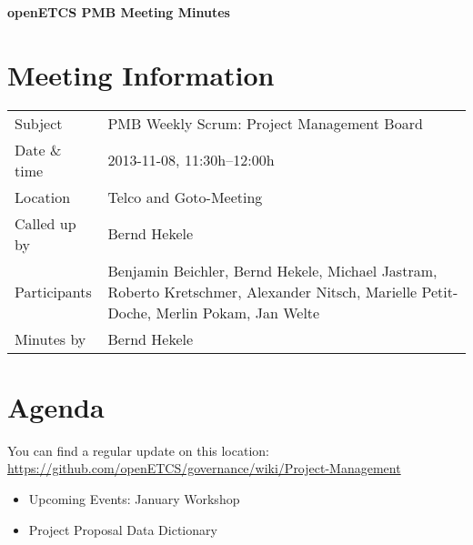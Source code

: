 \documentclass[a4paper, 11pt]{article}
\begin{document}
{\begin{center}\huge\bf openETCS PMB Meeting Minutes\end{center}}
\section{Meeting Information}

\renewcommand{\arraystretch}{1.5}
\begin{supertabular}{m{.2\textwidth}m{.8\textwidth}}
Subject & PMB Weekly Scrum: Project Management Board\\
Date \& time & 2013-11-08, 11:30h--12:00h\\
Location & Telco and Goto-Meeting\\
Called up by & Bernd Hekele\\
Participants &
Benjamin Beichler,
Bernd Hekele,
Michael Jastram,
Roberto Kretschmer,
Alexander Nitsch,
Marielle Petit-Doche,
Merlin Pokam,
Jan Welte
\\

Minutes by & Bernd Hekele\\

\end{supertabular}
\renewcommand{\arraystretch}{1.0}


\section{{Agenda}}
You can find a regular update on this location: \url{https://github.com/openETCS/governance/wiki/Project-Management}

\begin{itemize}
\item Upcoming Events: January Workshop
\item Project Proposal Data Dictionary
\end{itemize}
\end{document}

